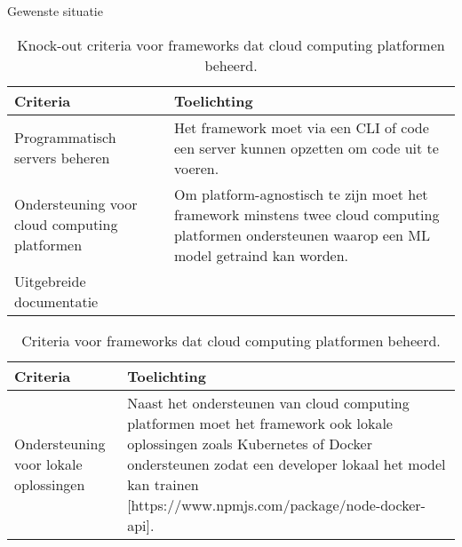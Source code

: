 
Gewenste situatie

\begin{table}[hbt!]
  \centering
  \begin{tabular}{|p{.2\linewidth}|p{.69\linewidth}|}
  \hline
  \textbf{Criteria} & \textbf{Toelichting} \\ \hline
    Programmatisch servers beheren
    &
    Het framework moet via een CLI of code een server kunnen opzetten om code uit te voeren. 
    \\ \hline

    Ondersteuning voor cloud \newline computing \newline platformen
    &
    Om platform-agnostisch te zijn moet het framework minstens twee cloud computing platformen ondersteunen waarop een ML model getraind kan worden.
    \\ \hline

    Uitgebreide documentatie
    &
    
    \\ \hline
  \end{tabular}
  \caption{Knock-out criteria voor frameworks dat cloud computing platformen beheerd.}
  \label{table:knock-out-criteria-framworks-that-manage-cloud-computing-platformen}
\end{table}

\begin{table}[hbt!]
  \centering
  \begin{tabular}{|p{.2\linewidth}|p{.69\linewidth}|}
  \hline
  \textbf{Criteria} & \textbf{Toelichting} \\ \hline
    Ondersteuning voor lokale \newline oplossingen
    &
    Naast het ondersteunen van cloud computing platformen moet het framework ook lokale oplossingen zoals Kubernetes of Docker ondersteunen zodat een developer lokaal het model kan trainen [https://www.npmjs.com/package/node-docker-api].
    \\ \hline
  \end{tabular}
  \caption{Criteria voor frameworks dat cloud computing platformen beheerd.}
  \label{table:criteria-framworks-that-manage-cloud-computing-platformen}
\end{table}



